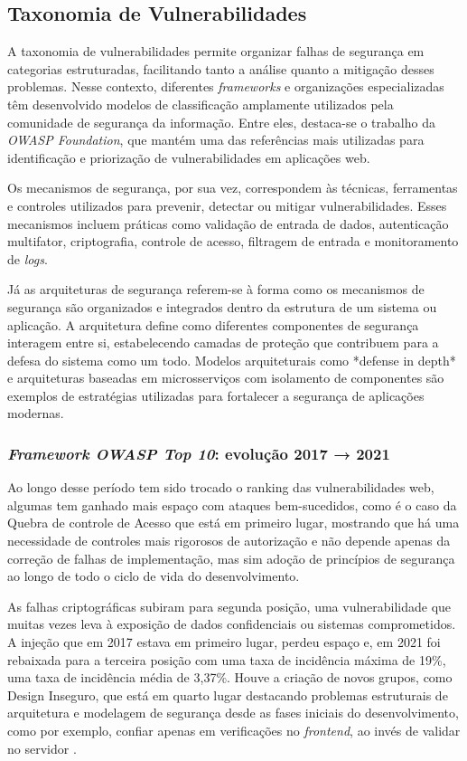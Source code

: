 \subsection{
    Taxonomia de Vulnerabilidades
} \label{sec:taxonomia_vulnerabilidades}


A taxonomia de vulnerabilidades permite organizar falhas de segurança em categorias estruturadas, facilitando tanto a análise quanto a mitigação desses problemas. Nesse contexto, diferentes \textit{frameworks} e organizações especializadas têm desenvolvido modelos de classificação amplamente utilizados pela comunidade de segurança da informação. Entre eles, destaca-se o trabalho da \textit{OWASP Foundation}, que mantém uma das referências mais utilizadas para identificação e priorização de vulnerabilidades em aplicações web. 

Os mecanismos de segurança, por sua vez, correspondem às técnicas, ferramentas e controles utilizados para prevenir, detectar ou mitigar vulnerabilidades. Esses mecanismos incluem práticas como validação de entrada de dados, autenticação multifator, criptografia, controle de acesso, filtragem de entrada e monitoramento de \textit{logs}.

Já as arquiteturas de segurança referem-se à forma como os mecanismos de segurança são organizados e integrados dentro da estrutura de um sistema ou aplicação. A arquitetura define como diferentes componentes de segurança interagem entre si, estabelecendo camadas de proteção que contribuem para a defesa do sistema como um todo. Modelos arquiteturais como *defense in depth* e arquiteturas baseadas em microsserviços com isolamento de componentes são exemplos de estratégias utilizadas para fortalecer a segurança de aplicações modernas. 

\subsubsection{
    \textit{Framework OWASP Top 10}: evolução 2017 → 2021
}

Ao longo desse período tem sido trocado o ranking das vulnerabilidades web, algumas tem ganhado mais espaço com ataques bem-sucedidos, como é o caso da Quebra de controle de Acesso que está em primeiro lugar, mostrando que há uma necessidade de controles mais rigorosos de autorização e não depende apenas da correção de falhas de implementação, mas sim adoção de princípios de segurança ao longo de todo o ciclo de vida do desenvolvimento. 

As falhas criptográficas subiram para segunda posição, uma vulnerabilidade que muitas vezes leva à exposição de dados confidenciais ou sistemas comprometidos. A injeção que em 2017 estava em primeiro lugar, perdeu espaço e, em 2021 foi rebaixada para a terceira posição com uma taxa de incidência máxima de 19\%, uma taxa de incidência média de 3,37\%. Houve a criação de novos grupos, como Design Inseguro, que está em quarto lugar destacando problemas estruturais de arquitetura e modelagem de segurança desde as fases iniciais do desenvolvimento, como por exemplo, confiar apenas em verificações no \textit{frontend}, ao invés de validar no servidor \cite{owasp:2021}.

